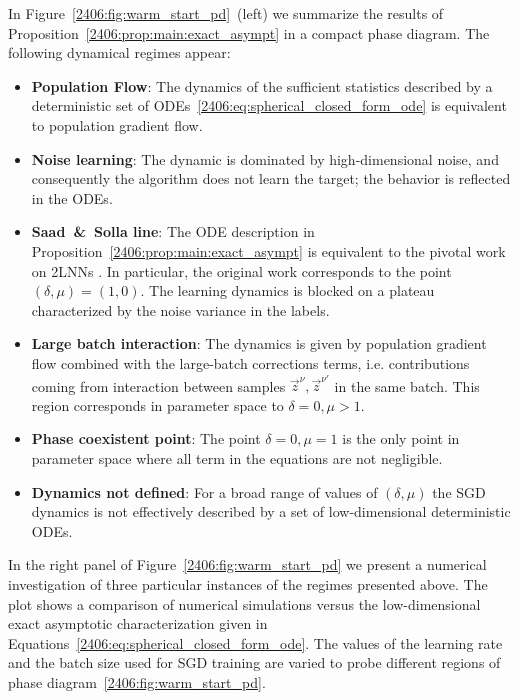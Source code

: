 In Figure~\ref{2406:fig:warm_start_pd}~(left) we summarize the results of Proposition~\ref{2406:prop:main:exact_asympt} in a compact phase diagram. 
The following dynamical regimes appear:
\begin{itemize}
    \item \textbf{Population Flow}: The dynamics of the sufficient statistics described by a deterministic set of ODEs~\eqref{2406:eq:spherical_closed_form_ode} is equivalent to population gradient flow. 
    \item \textbf{Noise learning}: The dynamic is dominated by high-dimensional noise, and consequently the algorithm does not learn the target;
        the behavior is reflected in the ODEs.
    \item \textbf{Saad~\&~Solla line}: The ODE description in Proposition~\ref{2406:prop:main:exact_asympt} is equivalent to the pivotal work on 2LNNs \cite{saad1995line}. In particular, the original work corresponds to the point \((\delta,\mu)=(1,0)\). The learning dynamics is blocked on a plateau characterized by the noise variance in the labels. 
    \item \textbf{Large batch interaction}: The dynamics is given by population gradient flow combined with the large-batch corrections terms, i.e. contributions coming from interaction between samples $\vec z^\nu, \vec z^{\nu'}$ in the same batch. This region corresponds in parameter space to \(\delta = 0, \mu > 1\).
    \item \textbf{Phase coexistent point}: The point \(\delta = 0, \mu = 1\) is the only point in parameter space where all term in the equations are not negligible.
    \item \textbf{Dynamics not defined}: For a broad range of values of \( (\delta, \mu) \) the SGD dynamics is not effectively described by a set of low-dimensional deterministic ODEs.
\end{itemize}
In the right panel of Figure~\ref{2406:fig:warm_start_pd} we present a numerical investigation of three particular instances of the regimes presented above. The plot shows a comparison of numerical simulations versus the low-dimensional exact asymptotic characterization given in Equations~\eqref{2406:eq:spherical_closed_form_ode}. The values of the learning rate and the batch size used for SGD training are varied to probe different regions of phase diagram~\ref{2406:fig:warm_start_pd}. 

